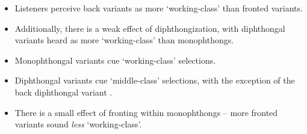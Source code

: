 \documentclass[a0,portrait]{a0poster}
\begin{document}
\begin{multicols}{3}
\begin{itemize}
\item{Listeners perceive back  variants as more `working-class' than fronted variants.}
\item{Additionally, there is a weak effect of  diphthongization, with diphthongal variants heard as more `working-class' than monophthongs.}
\item{Monophthongal  variants cue `working-class' selections.}
\item{Diphthongal  variants cue `middle-class' selections, with the exception of the back diphthongal variant \textipa{[oU]}.}
\item{There is a small effect of fronting within monophthongs -- more fronted variants sound \textit{less} `working-class'.}
\end{itemize}
\justify
\vspace*{-1cm}

\end{multicols}
\end{document}
